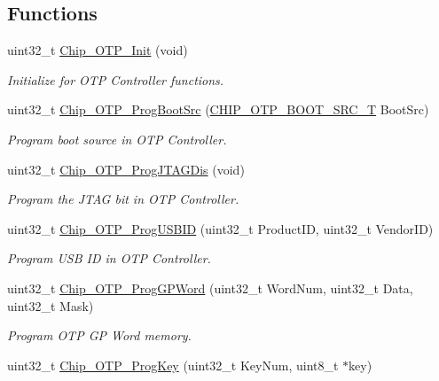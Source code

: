 \subsection*{Functions}
\begin{DoxyCompactItemize}
\item 
uint32\+\_\+t \hyperlink{group___o_t_p__18_x_x__43_x_x_ga511e3cb6017233783efebf0c9675cc97}{Chip\+\_\+\+O\+T\+P\+\_\+\+Init} (void)
\begin{DoxyCompactList}\small\item\em Initialize for O\+TP Controller functions. \end{DoxyCompactList}\item 
uint32\+\_\+t \hyperlink{group___o_t_p__18_x_x__43_x_x_gafefbdff9c8b9d1f5dd79a8dff3a44e08}{Chip\+\_\+\+O\+T\+P\+\_\+\+Prog\+Boot\+Src} (\hyperlink{group___o_t_p__18_x_x__43_x_x_gada36d39d34c8821f0416a852faa926f6}{C\+H\+I\+P\+\_\+\+O\+T\+P\+\_\+\+B\+O\+O\+T\+\_\+\+S\+R\+C\+\_\+T} Boot\+Src)
\begin{DoxyCompactList}\small\item\em Program boot source in O\+TP Controller. \end{DoxyCompactList}\item 
uint32\+\_\+t \hyperlink{group___o_t_p__18_x_x__43_x_x_gac6f321b6c7c397b3338c3ebe81d4d01f}{Chip\+\_\+\+O\+T\+P\+\_\+\+Prog\+J\+T\+A\+G\+Dis} (void)
\begin{DoxyCompactList}\small\item\em Program the J\+T\+AG bit in O\+TP Controller. \end{DoxyCompactList}\item 
uint32\+\_\+t \hyperlink{group___o_t_p__18_x_x__43_x_x_ga040917e9f2de58ca6cbff2993a5232b9}{Chip\+\_\+\+O\+T\+P\+\_\+\+Prog\+U\+S\+B\+ID} (uint32\+\_\+t Product\+ID, uint32\+\_\+t Vendor\+ID)
\begin{DoxyCompactList}\small\item\em Program U\+SB ID in O\+TP Controller. \end{DoxyCompactList}\item 
uint32\+\_\+t \hyperlink{group___o_t_p__18_x_x__43_x_x_gae9fc592f60829d5aefd72c9dbe83a58a}{Chip\+\_\+\+O\+T\+P\+\_\+\+Prog\+G\+P\+Word} (uint32\+\_\+t Word\+Num, uint32\+\_\+t Data, uint32\+\_\+t Mask)
\begin{DoxyCompactList}\small\item\em Program O\+TP GP Word memory. \end{DoxyCompactList}\item 
uint32\+\_\+t \hyperlink{group___o_t_p__18_x_x__43_x_x_gab94e93611ec4efa732ad045c471d646c}{Chip\+\_\+\+O\+T\+P\+\_\+\+Prog\+Key} (uint32\+\_\+t Key\+Num, uint8\+\_\+t $\ast$key)

\end{DoxyCompactItemize}
